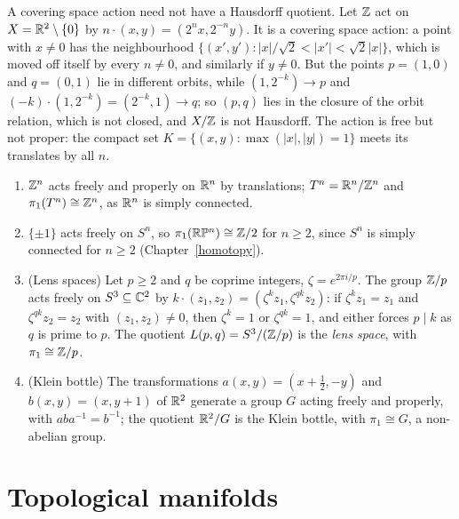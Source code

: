 \begin{counterexample}\label{topological-manifolds:counterexample-non-hausdorff-quotient}
A covering space action need not have a Hausdorff quotient. Let $\mathbb{Z}$ act on $X = \mathbb{R}^2 \setminus \{0\}$ by $n \cdot (x, y) = (2^nx, 2^{-n}y)$. It is a covering space action: a point with $x \neq 0$ has the neighbourhood
$\{(x', y') : |x|/\sqrt2 < |x'| < \sqrt2|x|\}$, which is moved off itself by every $n \neq 0$, and similarly if $y \neq 0$. But the points $p = (1, 0)$ and $q = (0, 1)$ lie in different orbits, while
$(1, 2^{-k}) \to p$ and $(-k) \cdot (1, 2^{-k}) = (2^{-k}, 1) \to q$; so $(p, q)$ lies in the closure of the orbit relation, which is not closed, and $X/\mathbb{Z}$ is not Hausdorff. The action is free but not proper: the compact set
$K = \{(x, y) : \max(|x|, |y|) = 1\}$ meets its translates by all $n$.
\end{counterexample}

\begin{example}\label{topological-manifolds:example-covering-actions}
\begin{enumerate}
\item $\mathbb{Z}^n$ acts freely and properly on $\mathbb{R}^n$ by translations; $T^n = \mathbb{R}^n/\mathbb{Z}^n$ and $\pi_1(T^n) \cong \mathbb{Z}^n$, as $\mathbb{R}^n$ is simply connected.
\item $\{\pm1\}$ acts freely on $S^n$, so $\pi_1(\mathbb{R}\mathbb{P}^n) \cong \mathbb{Z}/2$ for $n \geq 2$, since $S^n$ is simply connected for $n \geq 2$ (Chapter~\ref{homotopy}).
\item (Lens spaces) Let $p \geq 2$ and $q$ be coprime integers, $\zeta = e^{2\pi i/p}$. The group $\mathbb{Z}/p$ acts freely on $S^3 \subseteq \mathbb{C}^2$ by $k \cdot (z_1, z_2) = (\zeta^kz_1, \zeta^{qk}z_2)$: if $\zeta^kz_1 = z_1$ and
$\zeta^{qk}z_2 = z_2$ with $(z_1, z_2) \neq 0$, then $\zeta^k = 1$ or $\zeta^{qk} = 1$, and either forces $p \mid k$ as $q$ is prime to $p$. The quotient $L(p, q) = S^3/(\mathbb{Z}/p)$ is the \emph{lens space}, with
$\pi_1 \cong \mathbb{Z}/p$.
\item (Klein bottle) The transformations $a(x, y) = (x + \frac12, -y)$ and $b(x, y) = (x, y + 1)$ of $\mathbb{R}^2$ generate a group $G$ acting freely and properly, with $aba^{-1} = b^{-1}$; the quotient $\mathbb{R}^2/G$ is the Klein bottle, with
$\pi_1 \cong G$, a non-abelian group.
\end{enumerate}
\end{example}

\section{Topological manifolds}\label{topological-manifolds:section-manifolds}

